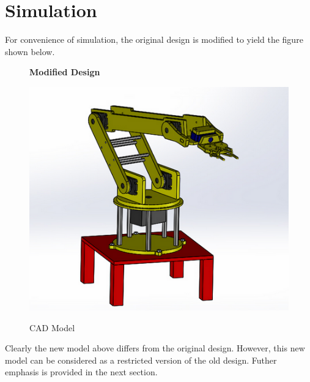 \documentclass[12pt]{article}
\begin{document}
\section{Simulation}
 For convenience of simulation, the original design is modified to yield
 the figure shown below.
 \begin{figure}[H]
    \centering
    \textbf{Modified Design}\par\medskip
    \includegraphics[scale = 0.4]{newmodel.png}\\[0.0 cm]	%
    \caption{CAD Model}
\end{figure} 
Clearly the new model above differs from the original design. However, this new model can be considered as a restricted version of the old design. Futher emphasis is provided in the next section.
  
\end{document}
